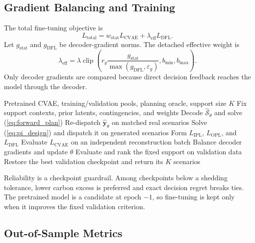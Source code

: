 \documentclass[times]{elsarticle}
\begin{document}
\subsection{Gradient Balancing and Training}

The total fine-tuning objective is
\begin{equation}
L_{\mathrm{total}}=w_{\mathrm{stat}}L_{\mathrm{CVAE}}
+\lambda_{\mathrm{eff}}L_{\mathrm{DFL}}.
\label{eq:total_loss}
\end{equation}
Let $g_{\mathrm{stat}}$ and $g_{\mathrm{DFL}}$ be decoder-gradient norms. The
detached effective weight is
\begin{equation}
\lambda_{\mathrm{eff}}=\lambda\operatorname{clip}\left(
r_g\frac{g_{\mathrm{stat}}}{\max(g_{\mathrm{DFL}},\varepsilon_g)},
b_{\min},b_{\max}\right).
\label{eq:gradient_balance}
\end{equation}
Only decoder gradients are compared because direct decision feedback reaches
the model through the decoder.

\begin{algorithm}[t]
\caption{Feasibility-aware CVAE fine-tuning}
\label{alg:training}
\begin{algorithmic}[1]
\Require Pretrained CVAE, training/validation pools, planning oracle, support size $K$
\State Fix support contexts, prior latents, contingencies, and weights
  \State Decode $\widehat{\mathcal S}_\theta$ and solve (\ref{eq:forward_plan})
  \State Re-dispatch $\widehat{\bm y}_\theta$ on matched real scenarios
  \State Solve (\ref{eq:pi_design}) and dispatch it on generated scenarios
  \State Form $L_{\mathrm{IPL}}$, $L_{\mathrm{OPL}}$, and $L_{\mathrm{DFL}}$
  \State Evaluate $L_{\mathrm{CVAE}}$ on an independent reconstruction batch
  \State Balance decoder gradients and update $\theta$
  \State Evaluate and rank the fixed support on validation data
\EndFor
\State Restore the best validation checkpoint and return its $K$ scenarios
\end{algorithmic}
\end{algorithm}

Reliability is a checkpoint guardrail. Among checkpoints below a shedding
tolerance, lower carbon excess is preferred and exact decision regret breaks
ties. The pretrained model is a candidate at epoch $-1$, so fine-tuning is kept
only when it improves the fixed validation criterion.

\subsection{Out-of-Sample Metrics}
\end{document}
